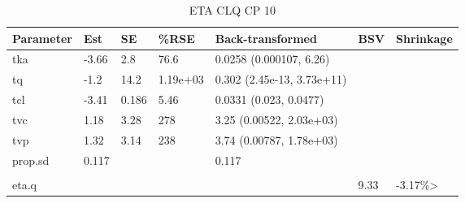 \begin{table}
\centering\centering
\caption{ETA CLQ CP 10}
\centering
\fontsize{8}{10}\selectfont
\begin{tabular}[t]{lllllll}
\toprule
\textbf{Parameter} & \textbf{Est} & \textbf{SE} & \textbf{\%RSE} & \textbf{Back-transformed} & \textbf{BSV} & \textbf{Shrinkage}\\
\midrule
tka & -3.66 & 2.8 & 76.6 & 0.0258 (0.000107, 6.26) &  & \\
\midrule
tq & -1.2 & 14.2 & 1.19e+03 & 0.302 (2.45e-13, 3.73e+11) &  & \\
\midrule
tcl & -3.41 & 0.186 & 5.46 & 0.0331 (0.023, 0.0477) &  & \\
\midrule
tvc & 1.18 & 3.28 & 278 & 3.25 (0.00522, 2.03e+03) &  & \\
\midrule
tvp & 1.32 & 3.14 & 238 & 3.74 (0.00787, 1.78e+03) &  & \\
\midrule
prop.sd & 0.117 &  &  & 0.117 &  & \\
\midrule\\
eta.q &  &  &  &  & 9.33 & -3.17\%>\\
\bottomrule
\end{tabular}
\end{table}